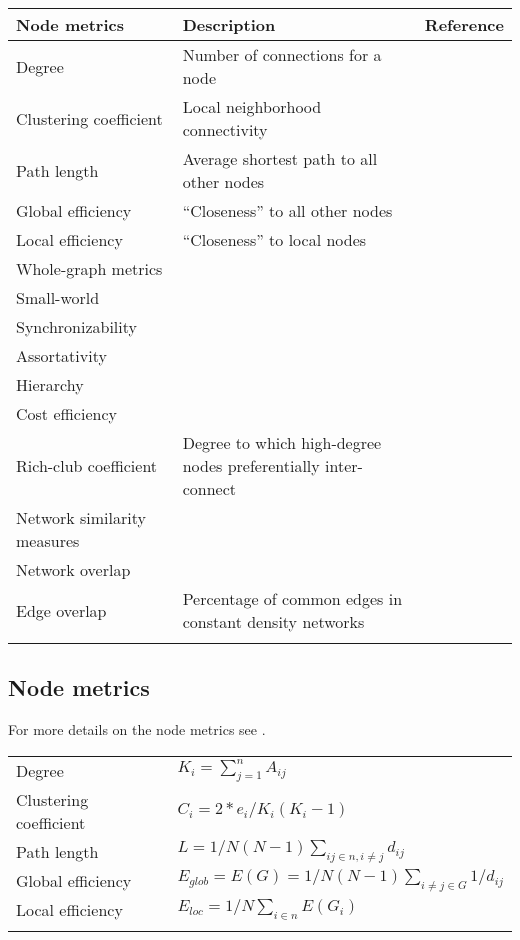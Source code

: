 \documentclass{frontiersSCNS} %
\begin{document}
\begin{table}[!t]
{\begin{tabular}{lll}
\midrule
Node metrics & Description & Reference\\\midrule
Degree & Number of connections for a node & \\
Clustering coefficient & Local neighborhood connectivity & \cite{Watts1998}\\
Path length & Average shortest path to all other nodes & \cite{Watts1998}\\
Global efficiency & ``Closeness'' to all other nodes & \cite{Latora2001}\\
Local efficiency & ``Closeness'' to local nodes & \\
\midrule
Whole-graph metrics\\
\midrule
Small-world & & \cite{Watts1998}\\
Synchronizability & & \cite{Motter2005}\\
Assortativity & & \cite{Newman2002}\\
Hierarchy & & \cite{Ravasz2003}\\
Cost efficiency & & \cite{Achard2007}\\
Rich-club coefficient & Degree to which high-degree nodes preferentially inter-connect & \cite{Colizza2006}\\
\midrule
Network similarity measures\\
\midrule
Network overlap & & \cite{vanWijk2010}\\
Edge overlap & Percentage of common edges in constant density networks & \cite{Weber2013} \\\botrule
\end{tabular}}{}
\end{table}

\subsection{Node metrics}
For more details on the node metrics see \cite{Rubinov2010}. 
\begin{table}[!t]
{\begin{tabular}{ll}
\midrule
Degree & $K_i = \sum_{j=1}^{n}{A_{ij}}$\\
Clustering coefficient & $C_i = 2*e_i / K_i ( K_i -1 )$\\
Path length & $L = 1/N(N-1) \sum_{ij \in n, i \neq j}{d_{ij}}$\\
Global efficiency & $E_{glob} = E(G) = 1/N(N-1) \sum_{i \neq j \in G}{1/d_{ij}}$\\
Local efficiency & $E_{loc} = 1/N \sum_{i \in n}{E(G_i)}$\\\botrule
\end{tabular}}{}
\end{table}
\end{document}
